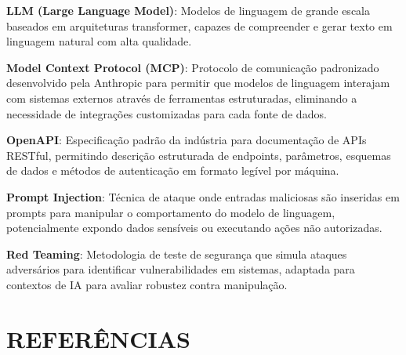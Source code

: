 \documentclass[
]{article}
\begin{document}
\textbf{LLM (Large Language Model)}: Modelos de linguagem de grande
escala baseados em arquiteturas transformer, capazes de compreender e
gerar texto em linguagem natural com alta qualidade.

\textbf{Model Context Protocol (MCP)}: Protocolo de comunicação
padronizado desenvolvido pela Anthropic para permitir que modelos de
linguagem interajam com sistemas externos através de ferramentas
estruturadas, eliminando a necessidade de integrações customizadas para
cada fonte de dados.

\textbf{OpenAPI}: Especificação padrão da indústria para documentação de
APIs RESTful, permitindo descrição estruturada de endpoints, parâmetros,
esquemas de dados e métodos de autenticação em formato legível por
máquina.

\textbf{Prompt Injection}: Técnica de ataque onde entradas maliciosas
são inseridas em prompts para manipular o comportamento do modelo de
linguagem, potencialmente expondo dados sensíveis ou executando ações
não autorizadas.

\textbf{Red Teaming}: Metodologia de teste de segurança que simula
ataques adversários para identificar vulnerabilidades em sistemas,
adaptada para contextos de IA para avaliar robustez contra manipulação.

\section*{REFERÊNCIAS}\label{referuxeancias}
\end{document}

